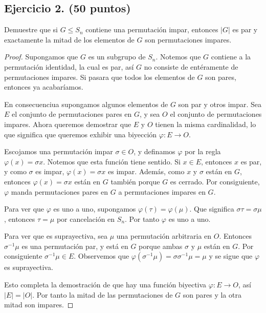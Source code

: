 \documentclass[letterpaper]{article}
\begin{document}
\subsection*{Ejercicio 2. (50 puntos)}
Demuestre que si $G \leq S_n$ contiene una permutación impar, entonces $|G|$ es par y exactamente la mitad
de los elementos de $G$ son permutaciones impares.

\begin{proof}
Supongamos que $G$ es un subgrupo de $S_n$. Notemos que $G$ contiene a la permutación identidad, la cual es
par, así $G$ no consiste de entéramente de permutaciones impares. Si pasara que todos los elementos de $G$
son pares, entonces ya acabaríamos.

En consecuenciua supongamos algunos elementos de $G$ son par y otros impar. Sea $E$ el conjunto de
permutaciones pares en $G$, y sea $O$ el conjunto de permutaciones impares. Ahora queremos demostrar que
$E$ y $O$ tienen la misma cardinalidad, lo que significa que queremos exhibir una biyección $\varphi : E \to O$.

Escojamos una permutación impar $\sigma \in O$, y definamos $\varphi$ por la regla $\varphi(x) = \sigma x$.
Notemos que esta función tiene sentido. Si $x \in E$, entonces $x$ es par, y como $\sigma$ es impar,
$\varphi(x) = \sigma x$ es impar. Además, como $x$ y $\sigma$ están en $G$, entonces $\varphi(x)=\sigma x$
están en $G$ también porque $G$ es cerrado. Por consiguiente, $\varphi$ manda permutaciones pares en $G$ a
permutaciones impares en $G$.

Para ver que $\varphi$ es uno a uno, supongamos $\varphi(\tau) = \varphi(\mu)$. Que significa
$\sigma \tau = \sigma \mu$, entonces $\tau = \mu$ por cancelación en $S_n$. Por tanto $\varphi$ es uno
a uno.

Para ver que es suprayectiva, sea $\mu$ una permutación arbitraria en $O$. Entonces $\sigma^{-1}\mu$ es una
permutación par, y está en $G$ porque ambas $\sigma$ y $\mu$ están en $G$. Por consiguiente
$\sigma^{-1}\mu \in E$. Observemos que $\varphi(\sigma^{-1}\mu) = \sigma \sigma^{-1} \mu = \mu$ y se sigue
que $\varphi$ es suprayectiva.

Esto completa la demostración de que hay una función biyectiva $\varphi : E \to O$, así $|E| = |O|$. Por tanto
la mitad de las permutaciones de $G$ son pares y la otra mitad son impares.
\end{proof}



\end{document}
